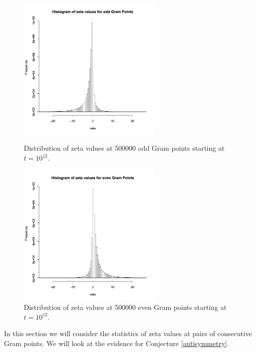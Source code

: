 \documentclass[twoside]{article}
\begin{document}
\begin{figure}
\centering
\includegraphics[width=0.62\textwidth]{ozeta.jpg}
\caption[]{ 
  Distribution of zeta values at 500000 odd Gram points starting at $t = 10^{12}$.
 }
\vspace{1mm}
\label{oddhist}

\includegraphics[width=0.62\textwidth]{ezeta.jpg}
\caption[]{ 
   Distribution of zeta values at 500000 even Gram points starting at $t = 10^{12}$.
 }
\label{evenhist}
\vspace{1mm}
\end{figure}

In this section we will consider the statistics of zeta values at pairs of consecutive Gram points. We will look at the evidence for Conjecture \ref{antisymmetry}. 
\end{document}
